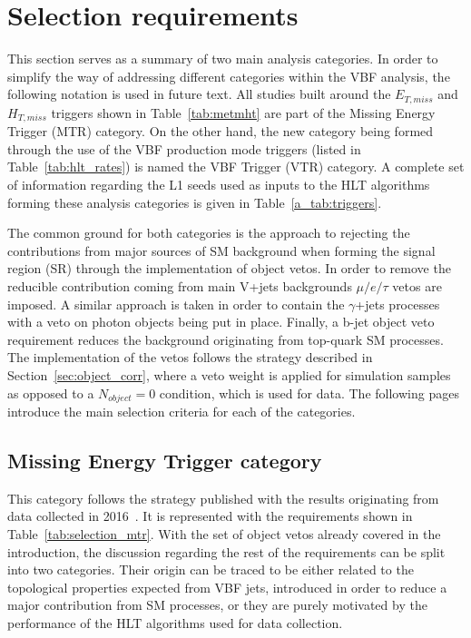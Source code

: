 \section{Selection requirements}
\hspace{10pt} This section serves as a summary of two main analysis categories. In order to simplify the way of addressing different categories within the VBF analysis, the following notation is used in future text. All studies built around the $E_{T,miss}$ and $H_{T,miss}$ triggers shown in Table~\ref{tab:metmht} are part of the Missing Energy Trigger (MTR) category. On the other hand, the new category being formed through the use of the VBF production mode triggers (listed in Table~\ref{tab:hlt_rates}) is named the VBF Trigger (VTR) category. A complete set of information regarding the L1 seeds used as inputs to the HLT algorithms forming these analysis categories is given in Table~\ref{a_tab:triggers}.

\hspace{10pt} The common ground for both categories is the approach to rejecting the contributions from major sources of SM background when forming the signal region (SR) through the implementation of object vetos. In order to remove the reducible contribution coming from main V+jets backgrounds $\mu/e/\tau$ vetos are imposed. A similar approach is taken in order to contain the $\gamma$+jets processes with a veto on photon objects being put in place. Finally, a b-jet object veto requirement reduces the background originating from top-quark SM processes. The implementation of the vetos follows the strategy described in Section~\ref{sec:object_corr}, where a veto weight is applied for simulation samples as opposed to a $N_{object}=0$ condition, which is used for data. The following pages introduce the main selection criteria for each of the categories.
\subsection{Missing Energy Trigger category}
\label{subsec:vbfselection}

\hspace{10pt} This category follows the strategy published with the results originating from data collected in 2016~\cite{paper:HIG_17_023}. It is represented with the requirements shown in Table~\ref{tab:selection_mtr}. With the set of object vetos already covered in the introduction, the discussion regarding the rest of the requirements can be split into two categories. Their origin can be traced to be either related to the topological properties expected from VBF jets, introduced in order to reduce a major contribution from SM processes, or they are purely motivated by the performance of the HLT algorithms used for data collection.

